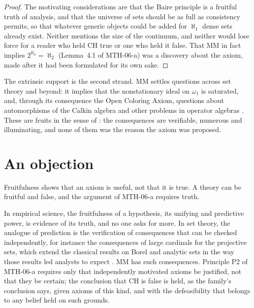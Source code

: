 \documentclass{situationist-preprint}
\begin{document}
\begin{proof}
The motivating considerations are that the Baire principle is a fruitful truth of analysis, and that the universe of sets should be as full as consistency permits, so that whatever generic objects could be added for $\aleph_1$ dense sets already exist. Neither mentions the size of the continuum, and neither would lose force for a reader who held CH true or one who held it false. That MM in fact implies $2^{\aleph_0} = \aleph_2$ (Lemma~4.1 of MTH-06-a) was a discovery about the axiom, made after it had been formulated for its own sake.
\end{proof}

The extrinsic support is the second strand. MM settles questions across set theory and beyond: it implies that the nonstationary ideal on $\omega_1$ is saturated, and, through its consequence the Open Coloring Axiom, questions about automorphisms of the Calkin algebra and other problems in operator algebras \citep{Farah2011}. These are fruits in the sense of \citet{Godel1947}: the consequences are verifiable, numerous and illuminating, and none of them was the reason the axiom was proposed.

\section{An objection}\label{s:obj}

\begin{objection}
Fruitfulness shows that an axiom is useful, not that it is true. A theory can be fruitful and false, and the argument of MTH-06-a requires truth.
\end{objection}

\begin{reply}
In empirical science, the fruitfulness of a hypothesis, its unifying and predictive power, is evidence of its truth, and no one asks for more. In set theory, the analogue of prediction is the verification of consequences that can be checked independently, for instance the consequences of large cardinals for the projective sets, which extend the classical results on Borel and analytic sets in the way those results led analysts to expect \citep{Maddy1988a,Maddy2011}. MM has such consequences. Principle P2 of MTH-06-a requires only that independently motivated axioms be justified, not that they be certain; the conclusion that CH is false is held, as the family's conclusion says, given axioms of this kind, and with the defeasibility that belongs to any belief held on such grounds.
\end{reply}
\end{document}
